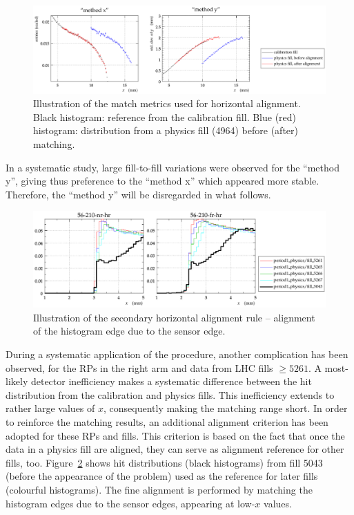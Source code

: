 \documentclass[TOTEM]{cern/cernphprep}
\begin{document}
\begin{figure}[h!]
\begin{center}
\includegraphics[width=1\hsize]{fig/physics_fills/match_method_example.pdf}
\caption{%
Illustration of the match metrics used for horizontal alignment. Black histogram: reference from the calibration fill. Blue (red) histogram: distribution from a physics fill (4964) before (after) matching.
}
\label{fig:hor_match_method}
\end{center}
\end{figure}

In a systematic study, large fill-to-fill variations were observed for the ``method y'', giving thus preference to the ``method x'' which appeared more stable. Therefore, the ``method y'' will be disregarded in what follows.

\begin{figure}[h!]
\begin{center}
\includegraphics[width=0.9\hsize]{fig/physics_fills/x_alignment_secondary_method.pdf}
\caption{%
Illustration of the secondary horizontal alignment rule -- alignment of the histogram edge due to the sensor edge.
}
\label{fig:hor_secondary_method}
\end{center}
\end{figure}

During a systematic application of the procedure, another complication has been observed, for the RPs in the right arm and data from LHC fills $\ge 5261$. A most-likely detector inefficiency makes a systematic difference between the hit distribution from the calibration and physics fills. This inefficiency extends to rather large values of $x$, consequently making the matching range short. In order to reinforce the matching results, an additional alignment criterion has been adopted for these RPs and fills. This criterion is based on the fact that once the data in a physics fill are aligned, they can serve as alignment reference for other fills, too. Figure~\ref{fig:hor_secondary_method} shows hit distributions (black histograms) from fill 5043 (before the appearance of the problem) used as the reference for later fills (colourful histograms). The fine alignment is performed by matching the histogram edges due to the sensor edges, appearing at low-$x$ values.
\end{document}
